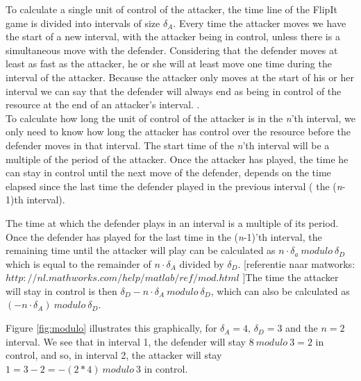 To calculate a single unit of control of the attacker, the time line of the FlipIt game is divided into intervals of size $\delta_{A}$. Every time the attacker moves we have the start of a new interval, with the attacker being in control, unless there is a simultaneous move with the defender. 
Considering that the defender moves at least as fast as the attacker, he or she will at least move one time during the interval of the attacker. Because the attacker only moves at the start of his or her interval we can say that the defender will always end as being in control of the resource at the end of an attacker's interval. 
. \\

To calculate how long the unit of control of the attacker is in the \textit{n}'th interval, we only need to know how long the attacker has control over the resource before the defender moves in that interval. The start time of the \textit{n}'th interval will be a multiple of the period of the attacker. Once the attacker has played, the time he can stay in control until the next move of the defender, depends on the time elapsed since the last time the defender played in the previous interval ( the (\textit{n}-1)th interval).  

The time at which the defender plays in an interval is a multiple of its period. Once the defender has played for the last time in the (\textit{n}-1)'th interval, the remaining time until the attacker will play can be calculated as $n \cdot \delta_{a}~modulo~ \delta_{D}$ which is equal to the remainder of $n\cdot \delta_{A}$ divided by $\delta_{D}$. [referentie naar matworks: $http://nl.mathworks.com/help/matlab/ref/mod.html$ ]The time the attacker will stay in control is then $\delta_{D}- n \cdot \delta_{A}~ modulo ~ \delta_{D}$, which can also be calculated as $( -n \cdot \delta_{A}) ~modulo~ \delta_{D}$.  

Figure \ref{fig:modulo} illustrates this graphically, for $\delta_{A}= 4$, $\delta_{D}=3$ and the $n=2$ interval. We see that in interval 1, the defender will stay $8 ~modulo~ 3 = 2$ in control, and so, in interval 2, the attacker will stay $1 = 3 - 2 = -(2*4) ~modulo~ 3$ in control.


